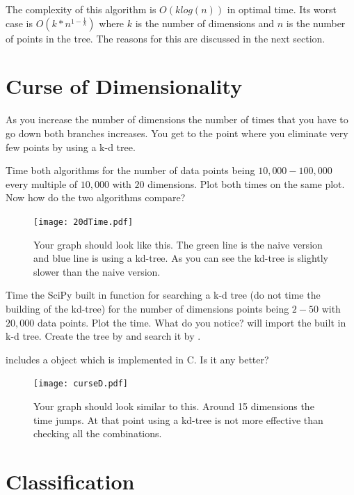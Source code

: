 The complexity of this algorithm is $O(klog(n))$ in optimal time.
Its worst case is $O(k*n^{1-\frac{1}{k}})$ where $k$ is the number of dimensions and $n$ is the number of points in the tree.
The reasons for this are discussed in the next section.

\section*{Curse of Dimensionality}

As you increase the number of dimensions the number of times that you have to go down both branches increases.
You get to the point where you eliminate very few points by using a k-d tree.

\begin{problem}
Time both algorithms for the number of data points being $10,000-100,000$ every multiple of $10,000$ with $20$ dimensions.
Plot both times on the same plot. Now how do the two algorithms compare?
\end{problem}

\begin{figure}[H]
\texttt{[image: 20dTime.pdf]}
\caption{
Your graph should look like this.
The green line is the naive version and blue line is using a kd-tree.
As you can see the kd-tree is slightly slower than the naive version.}
\end{figure}

\begin{problem}
Time the SciPy built in function for searching a k-d tree (do not time the building of the kd-tree) for the number of dimensions points being $2-50$ with $20,000$ data points.
Plot the time.
What do you notice?
 will import the built in k-d tree.
Create the tree by  and search it by .

 includes a  object which is implemented in C.
Is it any better?

\end{problem}
\begin{figure}[h!]
\texttt{[image: curseD.pdf]}
\caption{
Your graph should look similar to this.
Around 15 dimensions the time jumps.
At that point using a kd-tree is not more effective than checking all the combinations.}
\end{figure}

\section*{Classification}

